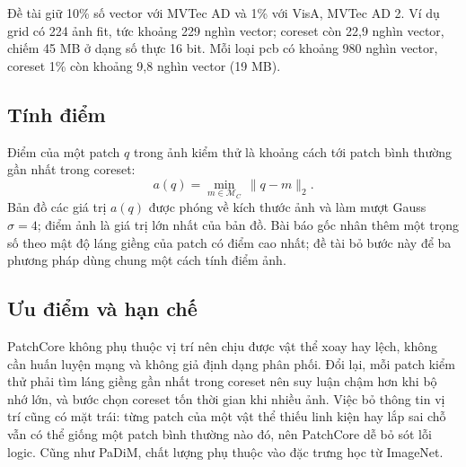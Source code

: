 Đề tài giữ 10\% số vector với MVTec AD và 1\% với VisA, MVTec AD 2. Ví dụ grid có 224 ảnh fit, tức khoảng 229 nghìn
vector; coreset còn 22,9 nghìn vector, chiếm 45 MB ở dạng số thực 16 bit. Mỗi loại pcb có khoảng 980 nghìn vector,
coreset 1\% còn khoảng 9,8 nghìn vector (19 MB).

\subsection{Tính điểm}

Điểm của một patch $q$ trong ảnh kiểm thử là khoảng cách tới patch bình thường gần nhất trong coreset:
\begin{equation}
  a(q) = \min_{m \in \mathcal{M}_C}\,\lVert q - m\rVert_{2} .
  \label{eq:patchcore-score}
\end{equation}
Bản đồ các giá trị $a(q)$ được phóng về kích thước ảnh và làm mượt Gauss $\sigma = 4$; điểm ảnh là giá trị lớn nhất
của bản đồ. Bài báo gốc nhân thêm một trọng số theo mật độ láng giềng của patch có điểm cao nhất; đề tài bỏ bước này
để ba phương pháp dùng chung một cách tính điểm ảnh.

\subsection{Ưu điểm và hạn chế}

PatchCore không phụ thuộc vị trí nên chịu được vật thể xoay hay lệch, không cần huấn luyện mạng và không giả định
dạng phân phối. Đổi lại, mỗi patch kiểm thử phải tìm láng giềng gần nhất trong coreset nên suy luận chậm hơn khi bộ
nhớ lớn, và bước chọn coreset tốn thời gian khi nhiều ảnh. Việc bỏ thông tin vị trí cũng có mặt trái: từng patch của
một vật thể thiếu linh kiện hay lắp sai chỗ vẫn có thể giống một patch bình thường nào đó, nên PatchCore dễ bỏ sót lỗi
logic. Cũng như PaDiM, chất lượng phụ thuộc vào đặc trưng học từ ImageNet.

